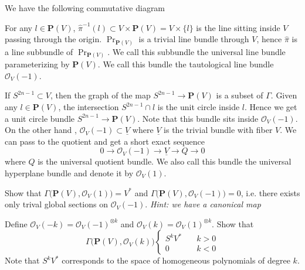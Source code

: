 \documentclass[
11pt, %
letterpaper， %
oneside, %
headinclude,footinclude, %
BCOR5mm, %
]{scrartcl}
\newcommand{\cp}{{\mathbf{P}}}
\newcommand{\proj}{\operatorname{Pr}}
\begin{document}
\begin{rem}
	We have the following commutative diagram
	\begin{center}
	\end{center}
For any $l \in \cp(V)$, $\hat{\pi}^{-1}(l)\subset V\times \cp(V)=V\times \{l\}$ is the line sitting inside $V$ passing through the origin. $\proj_{\cp(V)}$ is a trivial line bundle through $V$, hence $\hat{\pi}$ is a line subbundle of $\proj_{\cp(V)}$. We call this subbundle the universal line bundle parameterizing by $\cp(V)$. We call this bundle the tautological line bundle $\mathcal{O}_V(-1)$.
\end{rem}
\begin{rem}
	If $S^{2n-1}\subset V$, then the graph of the map $S^{2n-1}\to \cp(V)$ is a subset of $\Gamma$. Given any $l\in \cp(V)$, the intersection $S^{2n-1}\cap l$ is the unit circle inside $l$. Hence we get a unit circle bundle $S^{2n-1}\to \cp(V)$. Note that this bundle sits inside $\mathcal{O}_V(-1)$. On the other hand , $\mathcal{O}_V(-1)\subset \underline{V}$ where $\underline{V}$ is the trivial bundle with fiber $V$. We can pass to the quotient and get a short exact sequence
	\begin{equation*}
	0\to \mathcal{O}_V(-1) \to \underline{V}\to Q\to 0
	\end{equation*}
	where $Q$ is the universal quotient bundle. We also call this bundle the universal hyperplane bundle and denote it by $\mathcal{O}_V(1)$.
\end{rem}
\begin{exercise}
	Show that $\Gamma\big(\cp(V), \mathcal{O}_V(1) \big)=V^*$ and $\Gamma\big(\cp(V), \mathcal{O}_V(-1) \big)=0$, i.e. there exists only trival global sections on $\mathcal{O}_V(-1)$. \itshape{Hint}:	we have a canonical map 
	\begin{center}
	\end{center}
\end{exercise}
\begin{exercise}
	Define $\mathcal{O}_V(-k)=\mathcal{O}_V(-1)^{\otimes k}$ and $\mathcal{O}_V(k)=\mathcal{O}_V(1)^{\otimes k}$. Show that 
	\begin{equation*}
	\Gamma\big(\cp(V), \mathcal{O}_V(k) \big)\begin{cases}
	S^k V^* \quad &k>0\\
	0  &k<0
	\end{cases}
	\end{equation*}
	Note that $S^k V^*$ corresponds to the space of homogeneous polynomials of degree $k$.
\end{exercise}
\end{document}
